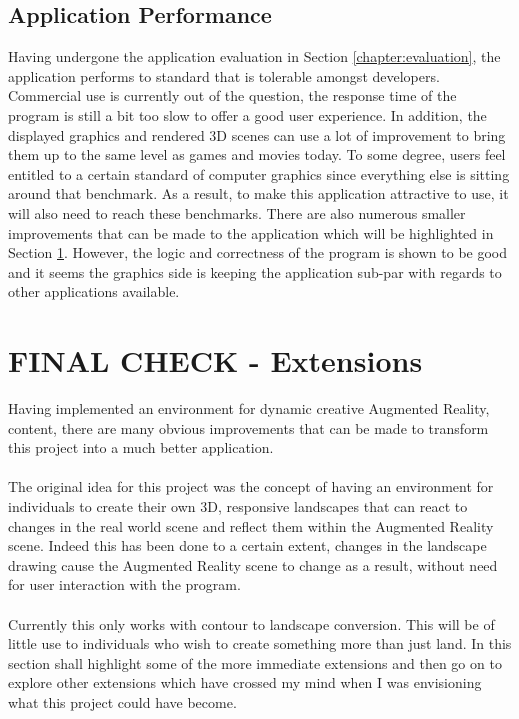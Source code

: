 \documentclass[11pt]{article}
\begin{document}
\subsection{Application Performance}
Having undergone the application evaluation in Section
\ref{chapter:evaluation}, the application performs to standard
that is tolerable amongst developers. Commercial use is
currently out of the question, the response time of the 
program is still a bit too slow to offer a good user
experience. In addition, the displayed graphics and
rendered 3D scenes can use a lot of improvement to bring
them up to the same level as games and movies today. To
some degree, users feel entitled to a certain
standard of computer graphics since everything else is
sitting around that benchmark. As a result, to make this
application attractive to use, it will also need to
reach these benchmarks. There are also numerous smaller
improvements that can be made to the application which
will be highlighted in Section \ref{chapter:extensions}. 
However, the logic and correctness of the program is
shown to be good and it seems the graphics side is
keeping the application sub-par with regards to
other applications available.

\section{FINAL CHECK - Extensions}
\label{chapter:extensions}
Having implemented an environment for dynamic creative Augmented Reality,
content, there are many obvious improvements that can be made to transform 
this project into a much better application. \\
\\
The original idea for this project was the concept of having an environment
for individuals to create their own 3D, responsive landscapes that can react
to changes in the real world scene and reflect them within the Augmented Reality scene. Indeed
this has been done to a certain extent, changes in the landscape drawing cause
the Augmented Reality scene to change as a result, without need for user interaction with the
program.\\
\\
Currently this only works with contour to landscape conversion. This
will be of little use to individuals who wish to create something more 
than just land. In this section shall highlight some of the more 
immediate extensions and then go on to explore other extensions 
which have crossed my mind when I was envisioning what 
this project could have become.
\end{document}
